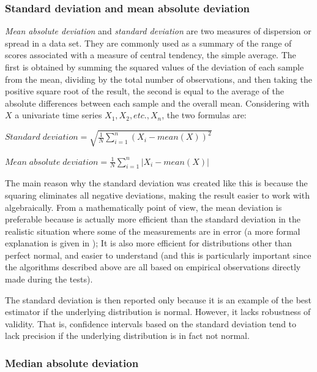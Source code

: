\documentclass[12pt,a4paper,cucitura]{toptesi}
\begin{document}
\subsubsection{Standard deviation and mean absolute deviation}

\emph{Mean absolute deviation} and \emph{standard deviation} are two measures of dispersion or spread in a data set. 
They are commonly used as a summary of the range of scores associated with a measure of central tendency, the simple average.
The first is obtained by summing the squared values of the deviation of each sample from the mean, dividing by the total number of observations, and then taking the positive square root of the result, the second is equal to the average of the absolute differences between each sample and the overall mean. 
Considering with $X$ a univariate time series $X_1, X_2, etc., X_n$, the two formulas are:

\begin{center}
\Large
$Standard\;deviation = \sqrt{\frac{1}{N}\sum_{i=1}^{n}{(X_i - mean(X))^2}}$
\end{center}

\begin{center}
\Large
$Mean\;absolute\;deviation = \frac{1}{N}\sum_{i=1}^{n}{\left | X_i - mean(X)\right |}$
\end{center}

The main reason why the standard deviation was created like this is because the squaring eliminates all negative deviations, making the result easier to work with algebraically.
From a mathematically point of view, the mean deviation is preferable because is actually more efficient than the standard deviation in the realistic situation where some of the measurements are in error (a more formal explanation is given in \cite{stddev}); It is also more efficient for distributions other than perfect normal, and easier to understand (and this is particularly important since the algorithms described above are all based on empirical observations directly made during the tests).

The standard deviation is then reported only because it is an example of the best estimator if the underlying distribution is normal. However, it lacks robustness of validity. That is, confidence intervals based on the standard deviation tend to lack precision if the underlying distribution is in fact not normal.

\subsubsection{Median absolute deviation}
\end{document}
